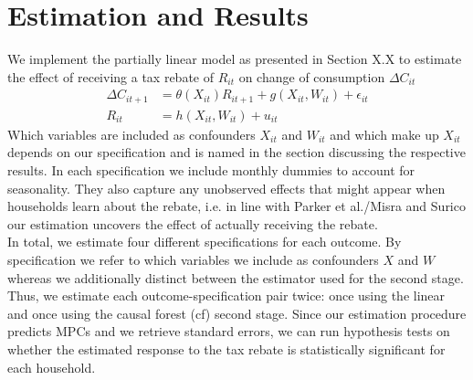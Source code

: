 \section{Estimation and Results} \label{sec:estim_res}
We implement the partially linear model as presented in Section X.X to estimate the effect of receiving a tax rebate of $R_{it}$ on change of consumption $\Delta C_{it}$
\begin{align}
    \Delta C_{it+1}&=\theta(X_{it})R_{it+1}+g(X_{it}, W_{it})+\epsilon_{it} \label{eq:plm_C1}\\
    R_{it}&=h(X_{it}, W_{it})+u_{it} \label{eq:plm_C2}
\end{align}
Which variables are included as confounders $X_{it}$ and $W_{it}$ and which make up $X_{it}$ depends on our specification and is named in the section discussing the respective results. In each specification we include monthly dummies to account for seasonality. They also capture any unobserved effects that might appear when households learn about the rebate, i.e. in line with Parker et al./Misra and Surico our estimation uncovers the effect of actually receiving the rebate. \\ 
In total, we estimate four different specifications for each outcome. By specification we refer to which variables we include as confounders $X$ and $W$ whereas we additionally distinct between the estimator used for the second stage. Thus, we estimate each outcome-specification pair twice: once using the linear and once using the causal forest (cf) second stage. Since our estimation procedure predicts MPCs and we retrieve standard errors, we can run hypothesis tests on whether the estimated response to the tax rebate is statistically significant for each household. 

